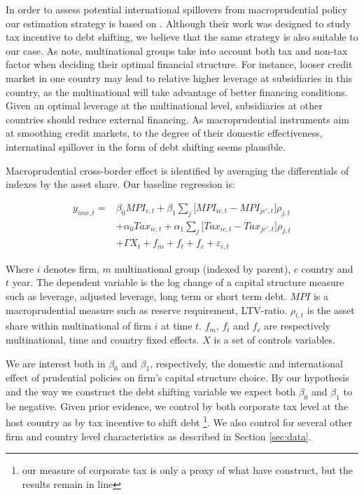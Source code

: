 \documentclass[12pt]{article}
\begin{document}
	
	In order to assess potential international spillovers from macroprudential policy our estimation strategy is based on \cite*{huizinga2008capital}. Although their work was designed to study tax incentive to debt shifting, we believe that the same strategy is also suitable to our case. As \cite{huizinga2008capital} note, multinational groups take into account both tax and non-tax factor when deciding their optimal financial structure. For instance, looser credit market in one country may lead to relative higher leverage at subsidiaries in this country, as the multinational will take advantage of better financing conditions. Given an optimal leverage at the multinational level, subsidiaries at other countries should reduce external financing. As macroprudential instruments aim at smoothing credit markets, to the degree of their domestic effectiveness, internatinal spillover in the form of debt shifting seems plausible.
	
	Macroprudential cross-border effect is identified by averaging the differentials of indexes by the asset share. Our baseline regression is:
	
	\begin{equation*}
	\begin{aligned}
	y_{imc,t}=&\beta_0MPI_{c,t}+\beta_1\sum_j\bigg[MPI_{ic,t} - MPI_{jc',t}\bigg]\rho_{j,t}\\
	&+\alpha_0Tax_{ic,t}+\alpha_1\sum_j\bigg[Tax_{ic,t} - Tax_{jc',t}\bigg]\rho_{j,t}\\
	&+\Gamma X_{t}+f_{m}+f_{t}+f_{c}+\varepsilon_{i,t}
	\end{aligned}
	\end{equation*}
	
	Where $i$ denotes firm, $m$ multinational group (indexed by parent), $c$ country and $t$ year. The dependent variable is the log change of a capital structure measure such as leverage, adjusted leverage, long term or short term debt. $MPI$ is a macroprudential measure such as reserve requirement, LTV-ratio. $\rho_{i,t}$ is the asset share within multinational of firm $i$ at time $t$. $f_{m}$, $f_{t}$ and $f_{c}$ are respectively multinational, time and country fixed effects. $X$ is a set of controls variables.
	
	We are interest both in $\beta_0$ and $\beta_1$, respectively, the domestic and international effect of prudential policies on firm's capital structure choice. By our hypothesis and the way we construct the debt shifting variable we expect both $\beta_0$ and $\beta_1$ to be negative. Given prior evidence, we control by both corporate tax level at the host country as by tax incentive to shift debt \footnote{our measure of corporate tax is only a proxy of what \cite{huizinga2008capital} have construct, but the results remain in line}. We also control for several other firm and country level characteristics as described in Section \ref{sec:data}.
	
\end{document}
